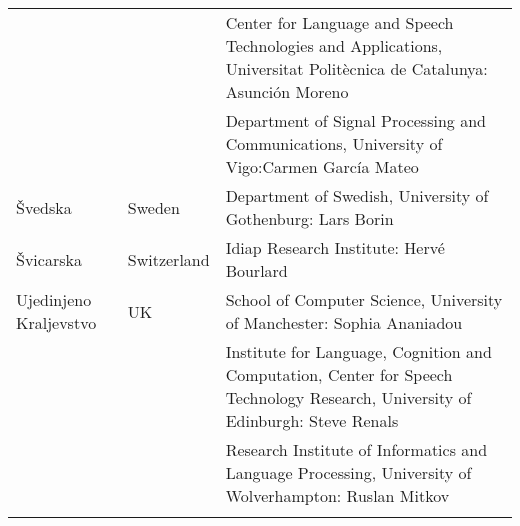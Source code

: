 \begin{longtable}{llp{115mm}}
  & & Center for Language and Speech Technologies and Applications, Universitat Politècnica de Catalunya:  Asunción Moreno \\ \addlinespace 
  & & Department of Signal Processing and Communications, University of Vigo:\newline Carmen García Mateo \\ \addlinespace 
  Švedska & \textcolor{grey1}{Sweden} & Department of Swedish, University of Gothenburg: Lars Borin \\ \addlinespace 
  Švicarska & \textcolor{grey1}{Switzerland} & Idiap Research Institute: Hervé Bourlard \\ \addlinespace 
  Ujedinjeno Kraljevstvo & \textcolor{grey1}{UK} & 
  School of Computer Science, University of Manchester: Sophia Ananiadou \\ \addlinespace 
  & & Institute for Language, Cognition and Computation, Center for Speech Technology Research, University of Edinburgh: Steve Renals \\ \addlinespace 
  & & Research Institute of Informatics and Language Processing, University of Wolverhampton: Ruslan Mitkov \\ \addlinespace 
\end{longtable}
\normalsize

\renewcommand*{\figureformat}{}
\renewcommand*{\captionformat}{}


\cleardoublepage

\label{whitepaperseries}

